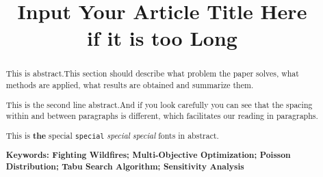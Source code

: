 \documentclass[12pt]{article}  %
\title{Input Your Article Title Here \\ if it is too Long}  %
\begin{document}
\begin{abstract}

    This is abstract.This section should describe what problem the paper solves, what methods are applied, what results are obtained and summarize them.

    This is the second line abstract.And if you look carefully you can see that the spacing within and between paragraphs is different, which facilitates our reading in paragraphs.

    This is \textbf{the} \textsf{special} \texttt{special} \textsl{special} \textit{special} fonts in abstract.

    \vspace{5pt}  %
    \textbf{Keywords: Fighting Wildfires; Multi-Objective Optimization; Poisson Distribution; Tabu Search Algorithm; Sensitivity Analysis}

\end{abstract}
\maketitle  %

\tableofcontents  %



%
\newpage

\end{document}
